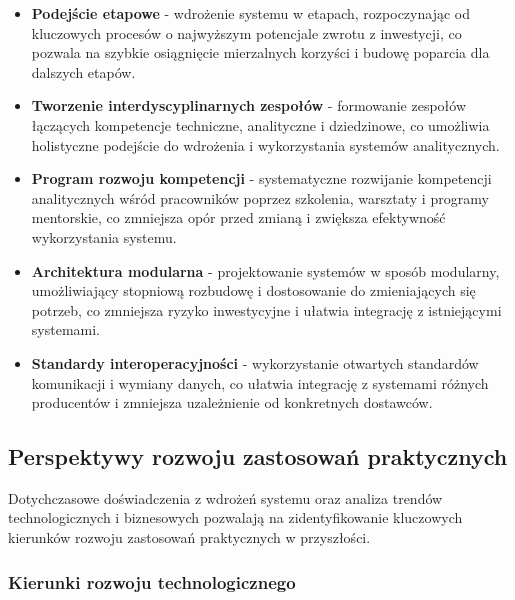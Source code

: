 \begin{itemize}
    \item \textbf{Podejście etapowe} - wdrożenie systemu w etapach, rozpoczynając od kluczowych procesów o najwyższym potencjale zwrotu z inwestycji, co pozwala na szybkie osiągnięcie mierzalnych korzyści i budowę poparcia dla dalszych etapów.
    \item \textbf{Tworzenie interdyscyplinarnych zespołów} - formowanie zespołów łączących kompetencje techniczne, analityczne i dziedzinowe, co umożliwia holistyczne podejście do wdrożenia i wykorzystania systemów analitycznych.
    \item \textbf{Program rozwoju kompetencji} - systematyczne rozwijanie kompetencji analitycznych wśród pracowników poprzez szkolenia, warsztaty i programy mentorskie, co zmniejsza opór przed zmianą i zwiększa efektywność wykorzystania systemu.
    \item \textbf{Architektura modularna} - projektowanie systemów w sposób modularny, umożliwiający stopniową rozbudowę i dostosowanie do zmieniających się potrzeb, co zmniejsza ryzyko inwestycyjne i ułatwia integrację z istniejącymi systemami.
    \item \textbf{Standardy interoperacyjności} - wykorzystanie otwartych standardów komunikacji i wymiany danych, co ułatwia integrację z systemami różnych producentów i zmniejsza uzależnienie od konkretnych dostawców.
\end{itemize}

\subsection{Perspektywy rozwoju zastosowań praktycznych}
\label{subsec:perspektywy_rozwoju}

Dotychczasowe doświadczenia z wdrożeń systemu oraz analiza trendów technologicznych i biznesowych pozwalają na zidentyfikowanie kluczowych kierunków rozwoju zastosowań praktycznych w przyszłości.

\subsubsection{Kierunki rozwoju technologicznego}
\label{subsubsec:kierunki_rozwoju_tech}

